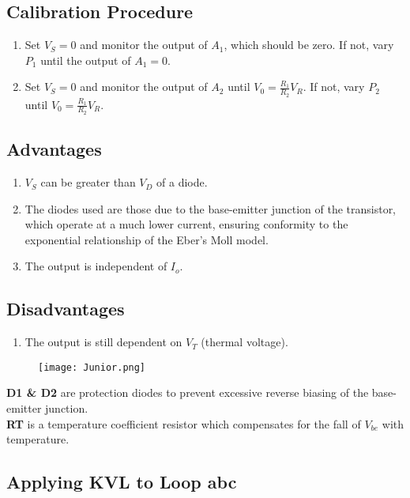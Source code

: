 \documentclass[a4paper,9pt,twoside,openany,twocolumn]{memoir}
\begin{document}
\subsection*{Calibration Procedure}
\begin{enumerate}
    \item Set \( V_S = 0 \) and monitor the output of \( A_1 \), which should be zero. If not, vary \( P_1 \) until the output of \( A_1 = 0 \).
    \item Set \( V_S = 0 \) and monitor the output of \( A_2 \) until \( V_0 = \frac{R_1}{R_2} V_R \). If not, vary \( P_2 \) until \( V_0 = \frac{R_1}{R_2} V_R \).
\end{enumerate}

\subsection*{Advantages}
\begin{enumerate}
    \item \( V_S \) can be greater than \( V_D \) of a diode.
    \item The diodes used are those due to the base-emitter junction of the transistor, which operate at a much lower current, ensuring conformity to the exponential relationship of the Eber’s Moll model.
    \item The output is independent of \( I_o \).
\end{enumerate}

\subsection*{Disadvantages}
\begin{enumerate}
    \item The output is still dependent on \( V_T \) (thermal voltage).
\end{enumerate}
\begin{figure}[H]
    \centering
    \texttt{[image: Junior.png]}
    \caption{}
    \label{fig:question_image}
\end{figure}

\textbf{D1 \& D2} are protection diodes to prevent excessive reverse biasing of the base-emitter junction. \\
\textbf{RT} is a temperature coefficient resistor which compensates for the fall of \( V_{be} \) with temperature.

\subsection*{Applying KVL to Loop abc}
\end{document}
